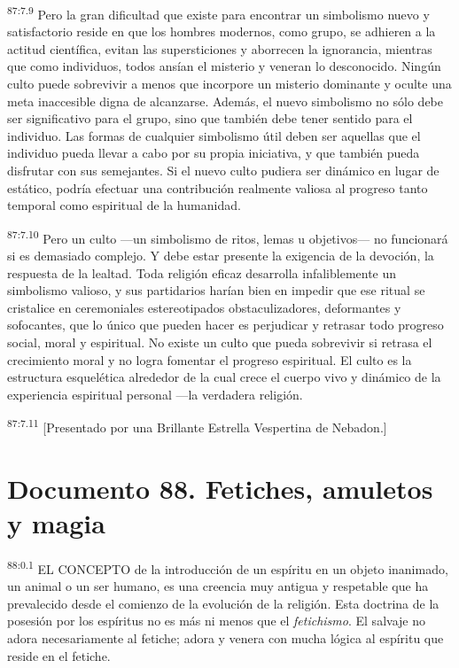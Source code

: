 \documentclass[twoside, 11pt]{book}
\begin{document}
\par
\textsuperscript{87:7.9} Pero la gran dificultad que existe para encontrar un simbolismo nuevo y satisfactorio reside en que los hombres modernos, como grupo, se adhieren a la actitud científica, evitan las supersticiones y aborrecen la ignorancia, mientras que como individuos, todos ansían el misterio y veneran lo desconocido. Ningún culto puede sobrevivir a menos que incorpore un misterio dominante y oculte una meta inaccesible digna de alcanzarse. Además, el nuevo simbolismo no sólo debe ser significativo para el grupo, sino que también debe tener sentido para el individuo. Las formas de cualquier simbolismo útil deben ser aquellas que el individuo pueda llevar a cabo por su propia iniciativa, y que también pueda disfrutar con sus semejantes. Si el nuevo culto pudiera ser dinámico en lugar de estático, podría efectuar una contribución realmente valiosa al progreso tanto temporal como espiritual de la humanidad.

\par
\textsuperscript{87:7.10} Pero un culto ---un simbolismo de ritos, lemas u objetivos--- no funcionará si es demasiado complejo. Y debe estar presente la exigencia de la devoción, la respuesta de la lealtad. Toda religión eficaz desarrolla infaliblemente un simbolismo valioso, y sus partidarios harían bien en impedir que ese ritual se cristalice en ceremoniales estereotipados obstaculizadores, deformantes y sofocantes, que lo único que pueden hacer es perjudicar y retrasar todo progreso social, moral y espiritual. No existe un culto que pueda sobrevivir si retrasa el crecimiento moral y no logra fomentar el progreso espiritual. El culto es la estructura esquelética alrededor de la cual crece el cuerpo vivo y dinámico de la experiencia espiritual personal ---la verdadera religión.

\par
\textsuperscript{87:7.11} [Presentado por una Brillante Estrella Vespertina de Nebadon.]


\chapter{Documento 88. Fetiches, amuletos y magia}
\par
\textsuperscript{88:0.1} EL CONCEPTO de la introducción de un espíritu en un objeto inanimado, un animal o un ser humano, es una creencia muy antigua y respetable que ha prevalecido desde el comienzo de la evolución de la religión. Esta doctrina de la posesión por los espíritus no es más ni menos que el \textit{fetichismo}. El salvaje no adora necesariamente al fetiche; adora y venera con mucha lógica al espíritu que reside en el fetiche.
\end{document}
